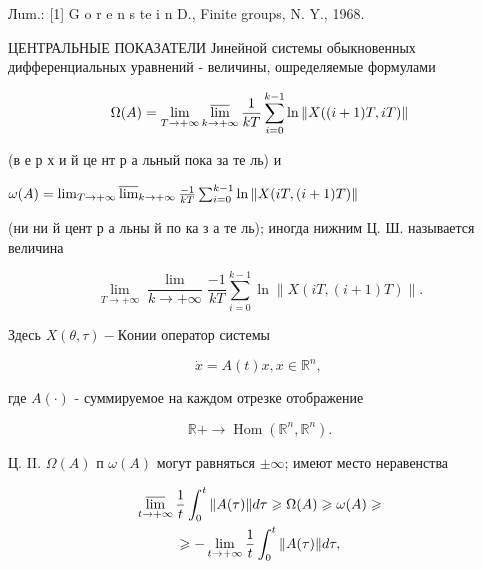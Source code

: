 \documentclass[10pt]{article}
\begin{document}
Лum.: [1] G o r e n s te i n D., Finite groups, N. Y., 1968.



ЦЕНТРАЛЬНЫЕ ПОКАЗАТЕЛИ Јинейной системы обыкновенных дифференциальных уравнений - величины, ошределяемые формулами



\[

\Omega(A)=\lim _{T \rightarrow+\infty} \varlimsup_{k \rightarrow+\infty} \frac{1}{k T} \sum_{i=0}^{k-1} \ln \|X((i+1) T, i T)\|

\]



(в е р х и й це нт р а льный пока за те ль) и



$\omega(A)=\lim _{T \rightarrow+\infty} \varlimsup_{k \rightarrow+\infty} \frac{-1}{k T} \sum_{i=0}^{k-1} \ln \|X(i T,(i+1) T)\|$



(ни ни й цент р а льны й по ка з а те ль); иногда нижним Ц. Ш. называется величина



\[

\lim _{T \rightarrow+\infty} \frac{\lim }{k \rightarrow+\infty} \frac{-1}{k T} \sum_{i=0}^{k-1} \ln \|X(i T,(i+1) T)\| .

\]



Здесь $X(\theta, \tau)-К о н и и$ оператор системы



\[

\dot{x}=A(t) x, x \in \mathbb{R}^{n} \text {, }

\]



где $A(\cdot)$ - суммируемое на каждом отрезке отображение



\[

\mathbb{R}+\rightarrow \operatorname{Hom}\left(\mathbb{R}^{n}, \mathbb{R}^{n}\right) .

\]



Ц. II. $\Omega(A)$ п $\omega(A)$ могут равняться $\pm \infty$; имеют место неравенства



\[

\begin{gathered}

\varlimsup_{t \rightarrow+\infty} \frac{1}{t} \int_{0}^{t}\|A(\tau)\| d \tau \geqslant \Omega(A) \geqslant \omega(A) \geqslant \\

\geqslant-\lim _{t \rightarrow+\infty} \frac{1}{t} \int_{0}^{t}\|A(\tau)\| d \tau,

\end{gathered}

\]
\end{document}
